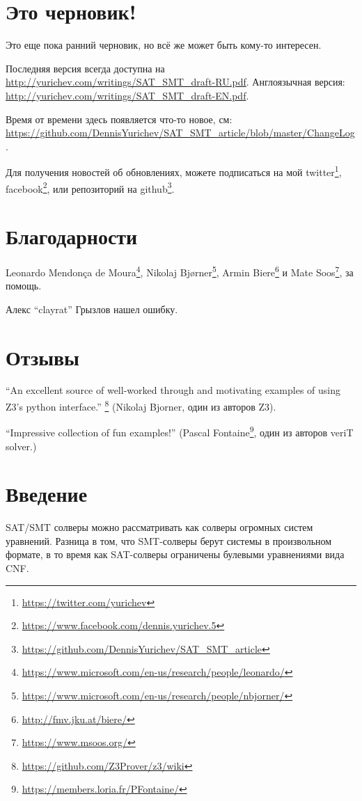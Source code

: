 \section{Это черновик!}

Это еще пока ранний черновик, но всё же может быть кому-то интересен.

Последняя версия всегда доступна на \url{http://yurichev.com/writings/SAT_SMT_draft-RU.pdf}.
Англоязычная версия: \url{http://yurichev.com/writings/SAT_SMT_draft-EN.pdf}.

Время от времени здесь появляется что-то новое, см: \url{https://github.com/DennisYurichev/SAT_SMT_article/blob/master/ChangeLog}.

Для получения новостей об обновлениях, можете подписаться на мой
twitter\footnote{\url{https://twitter.com/yurichev}}, 
facebook\footnote{\url{https://www.facebook.com/dennis.yurichev.5}}, 
или репозиторий на github\footnote{\url{https://github.com/DennisYurichev/SAT_SMT_article}}.

\section{Благодарности}

Leonardo Mendonça de Moura\footnote{\url{https://www.microsoft.com/en-us/research/people/leonardo/}},
Nikolaj Bjørner\footnote{\url{https://www.microsoft.com/en-us/research/people/nbjorner/}},
Armin Biere\footnote{\url{http://fmv.jku.at/biere/}} и
Mate Soos\footnote{\url{https://www.msoos.org/}},
за помощь.

Алекс ``clayrat'' Грызлов нашел ошибку.

\section{Отзывы}

``An excellent source of well-worked through and motivating examples of using Z3's python interface.''
\footnote{\url{https://github.com/Z3Prover/z3/wiki}}
(Nikolaj Bjorner, один из авторов Z3).

``Impressive collection of fun examples!''
(Pascal Fontaine\footnote{\url{https://members.loria.fr/PFontaine/}}, один из авторов veriT solver.)

\section{Введение}

\ac{SAT}/\ac{SMT} солверы можно рассматривать как солверы огромных систем уравнений.
Разница в том, что \ac{SMT}-солверы берут системы в произвольном формате,
в то время как \ac{SAT}-солверы ограничены булевыми уравнениями вида \ac{CNF}.

